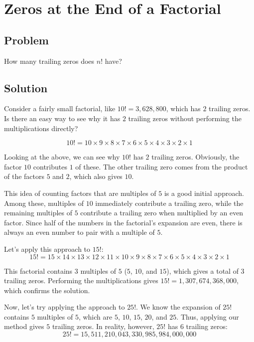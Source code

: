 \documentclass{article}
\date{}
\title{}
\author{Kaan Aksoy | Mar 28, 2020}
\begin{document}
\maketitle

\section{Zeros at the End of a Factorial}

\subsection{Problem}

How many trailing zeros does $n!$ have?

\subsection{Solution}

Consider a fairly small factorial, like $10! = 3,628,800$, which 
has $2$ trailing zeros. Is there an easy way to see why it has $2$ 
trailing zeros without performing the multiplications directly? 

$$10! = 10\times9\times8\times7\times6\times5\times4\times3\times2\times1$$

Looking at the above, we can see why $10!$ has $2$ trailing zeros. 
Obviously, the factor $10$ contributes $1$ of these. The other trailing zero 
comes from the product of the factors $5$ and $2$, which also gives $10$.

This idea of counting factors that are multiples of $5$ is a good 
initial approach. Among these, multiples of $10$ immediately contribute 
a trailing zero, while the remaining multiples of $5$ contribute a trailing 
zero when multiplied by an even factor. Since half of the numbers in the 
factorial's expansion are even, there is always an even number to pair 
with a multiple of $5$.

\vspace{0.5cm}

Let's apply this approach to $15!$:
$$
15! = 15\times14\times13\times12\times11\times
10\times9\times8\times7\times6\times5\times4\times3\times2\times1
$$

This factorial contains $3$ multiples of $5$ ($5$, $10$, and $15$), 
which gives a total of $3$ trailing zeros. Performing the 
multiplications gives $15! = 1,307,674,368,000$, which confirms 
the solution.

Now, let's try applying the approach to $25!$. We know the expansion 
of $25!$ contains $5$ multiples of $5$, which are $5$, $10$, $15$, 
$20$, and $25$. Thus, applying our method gives $5$ trailing zeros. 
In reality, however, $25!$ has $6$ trailing zeros:
$$25!= 15,511,210,043,330,985,984,000,000$$
\end{document}
